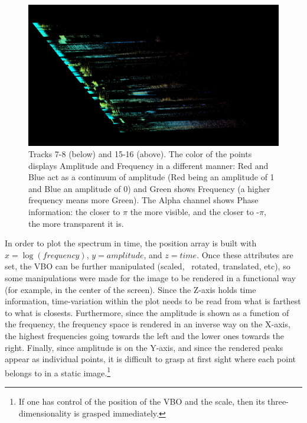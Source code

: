 \documentclass{article}
\begin{document}
\begin{figure}
\begin{multicols}{2}
    \includegraphics[width=\linewidth]{preset-50-8.jpg}%
\end{multicols}
\caption{Tracks 7-8 (below) and 15-16 (above). The color of the points displays Amplitude and Frequency in a different manner: Red and Blue act as a continuum of amplitude (Red being an amplitude of 1 and Blue an amplitude of 0) and Green shows Frequency (a higher frequency means more Green). The Alpha channel shows Phase information: the closer to $\pi$ the more visible, and the closer to -$\pi$, the more transparent it is.}
\end{figure}


In order to plot the spectrum in time, the position array is built with  $x=\log (\mathit{frequency})$,  $y=\mathit{amplitude}$, and  $z=\mathit{time}$. Once these attributes are set, the VBO can be further manipulated (scaled, \ rotated, translated, etc), so some manipulations were made for the image to be rendered in a functional way (for example, in the center of the screen). Since the Z-axis holds time information, time-variation within the plot needs to be read from what is farthest to what is closests. Furthermore, since the amplitude is shown as a function of the frequency, the frequency space is rendered in an inverse way on the X-axis, the highest frequencies going towards the left and the lower ones towards the right. Finally, since amplitude is on the Y-axis, and since the rendered peaks appear as individual points, it is difficult to grasp at first sight where each point belongs to in a static image.\footnote{If one has control of the position of the VBO and the scale, then its three-dimensionality is grasped immediately.} 
\end{document}
